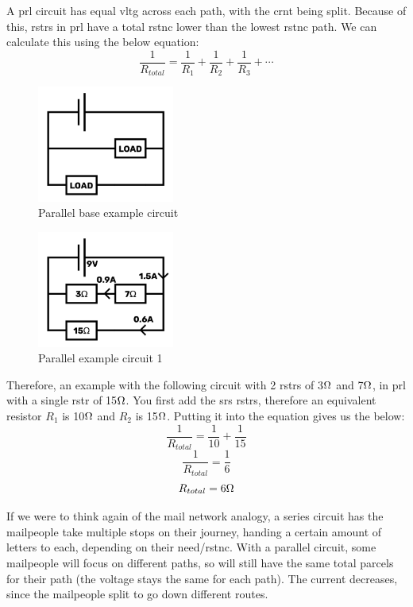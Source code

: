 \documentclass[a4paper,11pt]{report}
\begin{document}
A \gls{prl} circuit has equal \gls{vltg} across each path, with the \gls{crnt} being split. Because of this, \gls{rstr}s in \gls{prl} have a total \gls{rstnc} lower than the lowest \gls{rstnc} path.
We can calculate this using the below equation:
\[\frac{1}{R_{total}} = \frac{1}{R_1} + \frac{1}{R_2} + \frac{1}{R_3} + \cdots\]

\begin{figure}[H]
\centering
\includegraphics[width=0.4\textwidth]{parallel1}
\caption{Parallel base example circuit}
\end{figure}

\begin{figure}[H]
\centering
\includegraphics[width=0.4\textwidth]{parallel2}
\caption{Parallel example circuit 1}
\end{figure}

Therefore, an example with the following circuit with 2 \gls{rstr}s of 3$\ohm$ and 7$\ohm$, in \gls{prl} with a single \gls{rstr} of 15$\ohm$. You first add the \gls{srs} \gls{rstr}s, therefore an equivalent resistor $R_1$ is 10$\ohm$ and $R_2$ is 15$\ohm$. Putting it into the equation gives us the below:
\[\frac{1}{R_{total}} = \frac{1}{10} + \frac{1}{15}\]
\[\frac{1}{R_{total}} = \frac{1}{6}\]
\[R_{total} = 6\ohm\]

If we were to think again of the mail network analogy, a series circuit has the mailpeople take multiple stops on their journey, handing a certain amount of letters to each, depending on their need/\gls{rstnc}. With a parallel circuit, some mailpeople will focus on different paths, so will still have the same total parcels for their path (the voltage stays the same for each path). The current decreases, since the mailpeople split to go down different routes.
\end{document}
